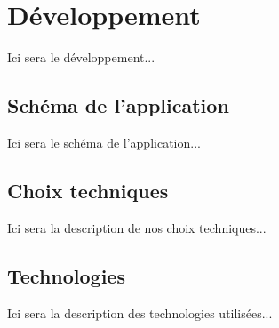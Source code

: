 \section{Développement}
Ici sera le développement...

\subsection{Schéma de l'application}
Ici sera le schéma de l'application...

\subsection{Choix techniques}
Ici sera la description de nos choix techniques...

\subsection{Technologies}
Ici sera la description des technologies utilisées...

